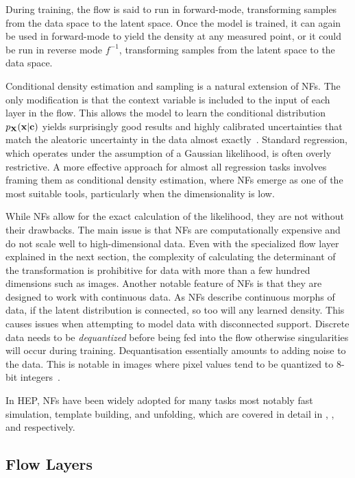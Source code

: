 During training, the flow is said to run in forward-mode, transforming samples from the data space to the latent space.
Once the model is trained, it can again be used in forward-mode to yield the density at any measured point, or it could be run in reverse mode $f^{-1}$, transforming samples from the latent space to the data space.

Conditional density estimation and sampling is a natural extension of NFs.
The only modification is that the context variable is included to the input of each layer in the flow.
This allows the model to learn the conditional distribution $p_{\mathbf{X}}(\mathbf{x}|\mathbf{c})$ yields surprisingly good results and highly calibrated uncertainties that match the aleatoric uncertainty in the data almost exactly~\cite{SolvingInverseProblems, InferenceAstrophysicalParameters, ComposingNormalizingFlows, NormalizingFlowsProbabilistic}.
Standard regression, which operates under the assumption of a Gaussian likelihood, is often overly restrictive.
A more effective approach for almost all regression tasks involves framing them as conditional density estimation, where NFs emerge as one of the most suitable tools, particularly when the dimensionality is low.

While NFs allow for the exact calculation of the likelihood, they are not without their drawbacks.
The main issue is that NFs are computationally expensive and do not scale well to high-dimensional data.
Even with the specialized flow layer explained in the next section, the complexity of calculating the determinant of the transformation is prohibitive for data with more than a few hundred dimensions such as images.
Another notable feature of NFs is that they are designed to work with continuous data.
As NFs describe continuous morphs of data, if the latent distribution is connected, so too will any learned density.
This causes issues when attempting to model data with disconnected support.
Discrete data needs to be \textit{dequantized} before being fed into the flow otherwise singularities will occur during training.
Dequantisation essentially amounts to adding noise to the data.
This is notable in images where pixel values tend to be quantized to 8-bit integers~\cite{FlowImprovingFlowBased}.

In HEP, NFs have been widely adopted for many tasks most notably fast simulation, template building, and unfolding, which are covered in detail in , , and  respectively.

\subsection{Flow Layers}

